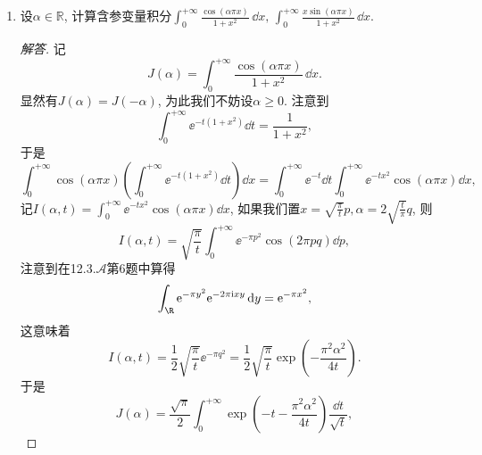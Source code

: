 \begin{quizb}
\begin{enumerate}
\begin{proof}
(2) 由 (1)，$f(+\infty)=f(-\infty)=0$。所以
\begin{align*}
f^2(x) & =\frac{1}{2}\left(f^2(x)-f^2(+\infty)\right)+\frac{1}{2}\left(f^2(x)-f^2(-\infty)\right) \\
& =\int_{+\infty}^x f(t) f'(t)\,dt+\int_{-\infty}^x f(t) f'(t)\,dt \\
& \leqslant \frac{1}{2} \int_{-\infty}^{+\infty}\left(f^2(t)+(f'(t))^2\right) d t=\frac{1}{2}.
\end{align*}
进一步，假设\(\|f\|_\infty=\frac{\sqrt{2}}{2}\)，
结合(1)的结论可得$|f|$的最大值在某个$a\in\R$取到，从而上面的不等式是等式，则有
\[f'(x)= \begin{cases}-f(x), & x\in(a,+\infty), \\ f(x), & x\in(-\infty,a),\end{cases}\]
由此得到
\[f(x)= \begin{cases}f(a)\,e^{a-x}, & x\in(a,+\infty), \\ f(a)\,e^{x-a}, & x\in(-\infty,a).\end{cases}\]
于是由条件中的$\|f\|_{H^1}=1$，可得 $f(a) \neq 0$。
而这时上式定义的 $f$ 在 $a$ 点不可导，矛盾。所以\(\|f\|_\infty<\frac{\sqrt{2}}{2}\)。
\end{proof}
\item 设\(\alpha\in\mathbb{R}\), 计算含参变量积分\(\int_{0}^{+\infty}\frac{\cos\left(\alpha\pi x\right)}{1+x^2}\,\dd x,\,\int_{0}^{+\infty}\frac{x\sin\left(\alpha\pi x\right)}{1+x^2}\,\dd x\).
\begin{proof}[解答]
	记\[J(\alpha)=\int_{0}^{+\infty}\frac{\cos\left(\alpha\pi x\right)}{1+x^2}\,\dd x.\]
    显然有\(J(\alpha)=J(-\alpha)\), 为此我们不妨设\(\alpha\geqslant 0\). 注意到
    \[\int_{0}^{+\infty}\ee^{-t(1+x^2)}\dd t=\frac{1}{1+x^2},\]
    于是
    \[\int_{0}^{+\infty}\cos\left(\alpha\pi x\right)\left(\int_{0}^{+\infty}\ee^{-t(1+x^2)}\dd t\right)\dd x
    =\int_{0}^{+\infty}\ee^{-t}\dd t\int_{0}^{+\infty}\ee^{-tx^2}\cos\left(\alpha\pi x\right)\dd x,\]
    记\(I(\alpha,t)=\int_{0}^{+\infty}\ee^{-tx^2}\cos\left(\alpha\pi x\right)\dd x\), 
    如果我们置\(x=\sqrt{\frac{\pi}{t}}p,\alpha=2\sqrt{\frac{t}{\pi}}q\), 则
    \[I(\alpha,t)=\sqrt{\frac{\pi}{t}}\int_{0}^{+\infty}\ee^{-\pi p^2}\cos\left(2\pi pq\right)\dd p,\]
    注意到在12.3.$\mathcal{A}$第6题中算得\[\int_{\R}\ee^{-\pi y^2}\ee^{-2\pi\ii xy}\,\dd y=\ee^{-\pi x^2},\]
    这意味着\[I(\alpha,t)=\frac{1}{2}\sqrt{\frac{\pi}{t}}\ee^{-\pi q^2}=\frac{1}{2}\sqrt{\frac{\pi}{t}}\exp\left(-\frac{\pi^2\alpha^2}{4t}\right).\]
    于是
    \[J(\alpha)=\frac{\sqrt{\pi}}{2}\int_{0}^{+\infty}\exp\left(-t-\frac{\pi^2\alpha^2}{4t}\right)\frac{\dd t}{\sqrt{t}},\]

\end{proof}
\end{enumerate}
\end{quizb}
